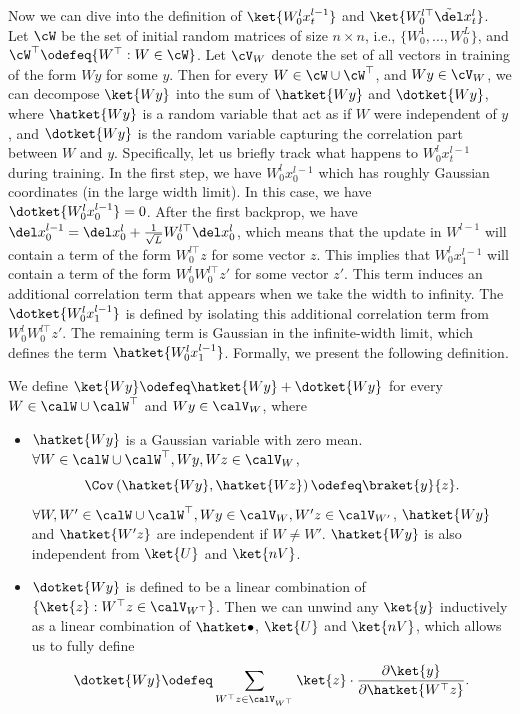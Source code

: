 Now we can dive into the definition of $\ket{W_0^l x_t^{l-1}}$ and $\ket{W_0^{l\top} \tilde\del x_t^l}$. Let $\cW$ be the set of initial random matrices of size $n\times n$, i.e., $\{W_0^1, \ldots, W_0^L\}$, and $\cW^\top\odefeq \{W^\top: W\in \cW\}$. Let $\cV_W$ denote the set of all vectors in training of the form $W y$ for some $y$. Then for every $W\in \cW\cup \cW^\top$, and $Wy\in \cV_W$, we can decompose $\ket{Wy}$ into the sum of $\hatket{Wy}$ and $\dotket{Wy}$, where $\hatket{Wy}$ is a random variable that act as if $W$ were independent of $y$, and $\dotket{Wy}$ is the random variable capturing the correlation part between $W$ and $y$. Specifically, let us briefly track what happens to $W^l_0 x^{l-1}_t$ during training. In the first step, we have $W^l_0 x^{l-1}_0$ which has roughly Gaussian coordinates (in the large width limit). In this case, we have $\dotket{W^l_0 x^{l-1}_0} = 0$. 
After the first backprop, we have $ \del x^{l-1}_0 = \del x^{l}_0 + \frac{1}{\sqrt{L}} W^{l\top}_0 \del x^{l}_0$, which means that the update in $W^{l-1}$ will contain a term of the form $W^{l\top}_0 z$ for some vector $z$. This implies that $W^{l}_0 x^{l-1}_1$ will contain a term of the form $W^{l}_0 W^{l\top}_0 z'$ for some vector $z'$. This term induces an additional correlation term that appears when we take the width to infinity. The $\dotket{W^{l}_0 x^{l-1}_1}$ is defined by isolating this additional correlation term from $W^{l}_0 W^{l\top}_0 z'$. The remaining term is Gaussian in the infinite-width limit, which defines the term $\hatket{W^{l}_0 x^{l-1}_1}$. Formally, we present the following definition.
\begin{defn}\label{def:zhatzdot}
    
    We define $\ket{Wy} \odefeq \hatket{Wy} + \dotket{Wy}$ for every $W \in \calW\cup \calW^\top$ and $Wy\in \calV_W$, where
    \begin{itemize}
        \item $\hatket{Wy}$ is a Gaussian variable with zero mean. $\forall W \in \calW\cup \calW^\top, Wy, Wz\in \calV_W$,
        \[ \Cov\left(\hatket{Wy}, \hatket{Wz}\right) \odefeq \braket{y}{z}.\]
        $\forall W, W' \in \calW\cup \calW^\top, Wy\in \calV_W, W'z\in \calV_{W'}$, $\hatket{Wy}$ and $\hatket{W'z}$ are independent if $W\neq W'$.
        $\hatket{Wy}$ is also independent from $\ket{U}$ and $\ket{nV}$.
        \item $\dotket{Wy}$ is defined to be a linear combination of $\{\ket{z}: W^\top z \in \calV_{W^\top}\}$. Then we can unwind any $\ket{y}$ inductively as a linear combination of $\hatket \bullet$, $\ket{U}$ and $\ket{nV}$, which allows us to fully define 
        \[\dotket{Wy}\odefeq\sum_{W^\top z\in \calV_{W^\top}} \ket{z} \cdot \frac{\partial \ket{y}}{\partial \hatket{W^\top z}}. \]
    \end{itemize}
\end{defn}

